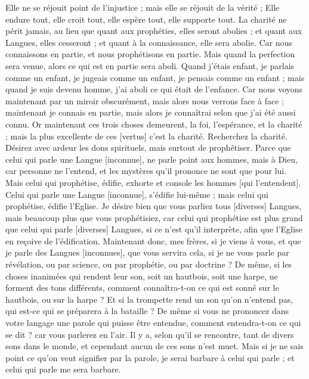 \begin{multicols}{2}
Elle ne se réjouit point de l'injustice ; mais elle se réjouit de la vérité ;
Elle endure tout, elle croit tout, elle espère tout, elle supporte tout.
La charité ne périt jamais, au lieu que quant aux prophéties, elles seront abolies ; et quant aux Langues, elles cesseront ; et quant à la connaissance, elle sera abolie.
Car nous connaissons en partie, et nous prophétisons en partie.
Mais quand la perfection sera venue, alors ce qui est en partie sera aboli.
Quand j'étais enfant, je parlais comme un enfant, je jugeais comme un enfant, je pensais comme un enfant ; mais quand je suis devenu homme, j'ai aboli ce qui était de l'enfance.
Car nous voyons maintenant par un miroir obscurément, mais alors nous verrons face à face ; maintenant je connais en partie, mais alors je connaîtrai selon que j'ai été aussi connu.
Or maintenant ces trois choses demeurent, la foi, l'espérance, et la charité ; mais la plus excellente de ces [vertus] c'est la charité.
\VerseOne{}Recherchez la charité. Désirez avec ardeur les dons spirituels, mais surtout de prophétiser.
Parce que celui qui parle une Langue [inconnue], ne parle point aux hommes, mais à Dieu, car personne ne l'entend, et les mystères qu'il prononce ne sont que pour lui.
Mais celui qui prophétise, édifie, exhorte et console les hommes [qui l'entendent].
Celui qui parle une Langue [inconnue], s'édifie lui-même ; mais celui qui prophétise, édifie l'Eglise.
Je désire bien que vous parliez tous [diverses] Langues, mais beaucoup plus que vous prophétisiez, car celui qui prophétise est plus grand que celui qui parle [diverses] Langues, si ce n'est qu'il interprète, afin que l'Eglise en reçoive de l'édification.
Maintenant donc, mes frères, si je viens à vous, et que je parle des Langues [inconnues], que vous servira cela, si je ne vous parle par révélation, ou par science, ou par prophétie, ou par doctrine ?
De même, si les choses inanimées qui rendent leur son, soit un hautbois, soit une harpe, ne forment des tons différents, comment connaîtra-t-on ce qui est sonné sur le hautbois, ou sur la harpe ?
Et si la trompette rend un son qu'on n'entend pas, qui est-ce qui se préparera à la bataille ?
De même si vous ne prononcez dans votre langage une parole qui puisse être entendue, comment entendra-t-on ce qui se dit ? car vous parlerez en l'air.
Il y a, selon qu'il se rencontre, tant de divers sons dans le monde, et cependant aucun de ces sons n'est muet.
Mais si je ne sais point ce qu'on veut signifier par la parole, je serai barbare à celui qui parle ; et celui qui parle me sera barbare.

\end{multicols}
